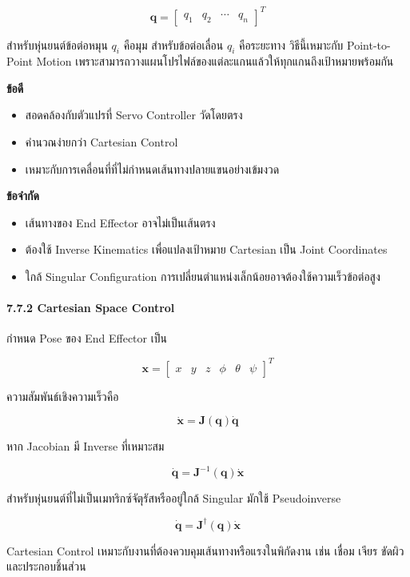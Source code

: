 \[
\mathbf{q}=\begin{bmatrix}q_1&q_2&\cdots&q_n\end{bmatrix}^T
\]

สำหรับหุ่นยนต์ข้อต่อหมุน $q_i$ คือมุม สำหรับข้อต่อเลื่อน $q_i$ คือระยะทาง วิธีนี้เหมาะกับ Point-to-Point Motion เพราะสามารถวางแผนโปรไฟล์ของแต่ละแกนแล้วให้ทุกแกนถึงเป้าหมายพร้อมกัน

\textbf{ข้อดี}

\begin{itemize}
    \item สอดคล้องกับตัวแปรที่ Servo Controller วัดโดยตรง
    \item คำนวณง่ายกว่า Cartesian Control
    \item เหมาะกับการเคลื่อนที่ที่ไม่กำหนดเส้นทางปลายแขนอย่างเข้มงวด
\end{itemize}

\textbf{ข้อจำกัด}

\begin{itemize}
    \item เส้นทางของ End Effector อาจไม่เป็นเส้นตรง
    \item ต้องใช้ Inverse Kinematics เพื่อแปลงเป้าหมาย Cartesian เป็น Joint Coordinates
    \item ใกล้ Singular Configuration การเปลี่ยนตำแหน่งเล็กน้อยอาจต้องใช้ความเร็วข้อต่อสูง
\end{itemize}

\paragraph{7.7.2 Cartesian Space Control}

กำหนด Pose ของ End Effector เป็น

\[
\mathbf{x}=\begin{bmatrix}x&y&z&\phi&\theta&\psi\end{bmatrix}^T
\]

ความสัมพันธ์เชิงความเร็วคือ

\[
\dot{\mathbf{x}}=\mathbf{J}(\mathbf{q})\dot{\mathbf{q}}
\]

หาก Jacobian มี Inverse ที่เหมาะสม

\[
\dot{\mathbf{q}}=\mathbf{J}^{-1}(\mathbf{q})\dot{\mathbf{x}}
\]

สำหรับหุ่นยนต์ที่ไม่เป็นเมทริกซ์จัตุรัสหรืออยู่ใกล้ Singular มักใช้ Pseudoinverse

\[
\dot{\mathbf{q}}=\mathbf{J}^{\dagger}(\mathbf{q})\dot{\mathbf{x}}
\]

Cartesian Control เหมาะกับงานที่ต้องควบคุมเส้นทางหรือแรงในพิกัดงาน เช่น เชื่อม เจียร ขัดผิว และประกอบชิ้นส่วน


